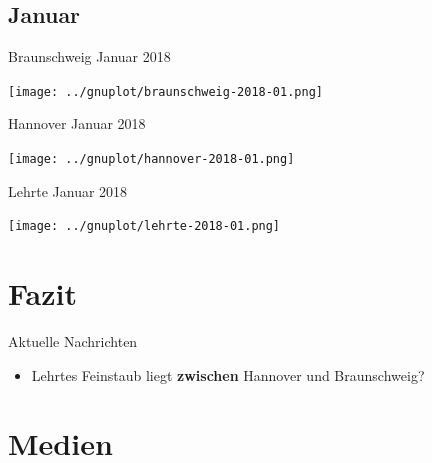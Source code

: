 \documentclass[aspectratio=169]{beamer} %
\begin{document}
\subsection{Januar}
\begin{frame}{Braunschweig Januar 2018}
  \begin{center}
    \texttt{[image: ../gnuplot/braunschweig-2018-01.png]}
  \end{center}
\end{frame}
\begin{frame}{Hannover \hspace{4cm} Januar 2018}
  \begin{center}
    \texttt{[image: ../gnuplot/hannover-2018-01.png]}
  \end{center}
\end{frame}
\begin{frame}{Lehrte \hspace{2cm} Januar 2018}
  \begin{center}
    \texttt{[image: ../gnuplot/lehrte-2018-01.png]}
  \end{center}
\end{frame}

\section{Fazit}
\begin{frame}{Aktuelle Nachrichten}
  \begin{itemize}
  \item Lehrtes Feinstaub liegt \textbf{zwischen} Hannover und Braunschweig?
  \end{itemize}
\end{frame}

\section{Medien}
\end{document}
